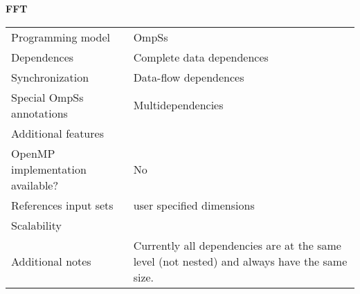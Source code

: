 \section*{}
\centering
\Huge
\textbf{FFT}
\label{fft}

\begin{table}[h!]
  \large
  \centering
  \begin{tabular}{|l|p{8cm}|}
    \hline
    Programming model                & OmpSs \\
    Dependences                      & Complete data dependences \\
    Synchronization                  & Data-flow dependences \\
    Special OmpSs annotations        & Multidependencies \\
    Additional features              & \\
    OpenMP implementation available? & No \\
    References input sets            & user specified dimensions \\
    Scalability                      & \\
    Additional notes                 & Currently all dependencies are at the same level (not nested) and always have the same size. \\
    \hline
  \end{tabular}
\end{table}


\newpage

